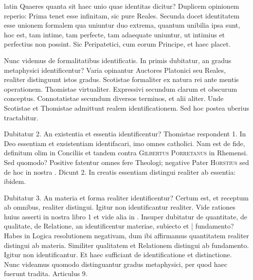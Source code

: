\begin{otherlanguage*}{latin}
\pstart
Quaeres quanta sit haec unio quae identitas dicitur? Duplicem opinionem reperio:
Prima tenet esse infinitam, sic pure Reales. Secunda docet identitatem esse unionem formalem qua uniuntur duo extrema, quantum unibilia ipsa sunt, hoc est, tam intime, tam perfecte, tam adaequate uniuntur, ut intimius et perfectius non possint. Sic Peripatetici, cum eorum Principe, et haec placet. 
\pend

\pstart
Nunc videmus de formalitatibus identificatis. In primis dubitatur, an gradus metaphysici identificentur? Varia opinantur Auctores Platonici seu Reales, realiter distinguunt istos gradus. Scotistae formaliter ex natura rei ante mentis operationem. Thomistae virtualiter. Expressivi secundum clarum et obscurum conceptus. Connotatistae secundum diversos terminos, et alii aliter. Unde Scotistae et Thomistae admittunt realem identificationem. Sed hoc postea uberius tractabitur. 
\pend

\pstart
Dubitatur 2. An existentia et essentia identificentur? Thomistae respondent 1. In Deo essentiam et exsistentiam identifacari, imo omnes catholici. Nam est de fide, definitum olim in Conciliis et tandem contra \textsc{Gilbertus Porretanus} in Rhemensi. Sed quomodo? Positive fatentur omnes fere Theologi; negative Pater \textsc{Horstius} sed de hoc in nostra . Dicunt 2. In creatis essentiam distingui realiter ab essentia:
ibidem. 
\pend

\pstart
Dubitatur 3. An materia et forma realiter identificentur? Certum est, et receptum ab omnibus, realiter distingui. Igitur non identificantur realiter. Vide rationes huius asserti in nostra  libro 1 et vide alia in . Insuper dubitatur de quantitate, de qualitate, de Relatione, an identificentur materiae, subiecto et \textnormal{|} fundamento? Habes in Logica resolutionem negativam, dum ibi affirmamus quantitatem realiter distingui ab materia. Similiter qualitatem et Relationem distingui ab fundamento. Igitur non identificantur. Et haec sufficiant de identificatione et distinctione. Nunc videamus quomodo distinguantur gradus metaphysici, per quod haec fuerunt tradita. Articulus 9. 
\pend

\pstart
{}
\pend


\end{otherlanguage*}
